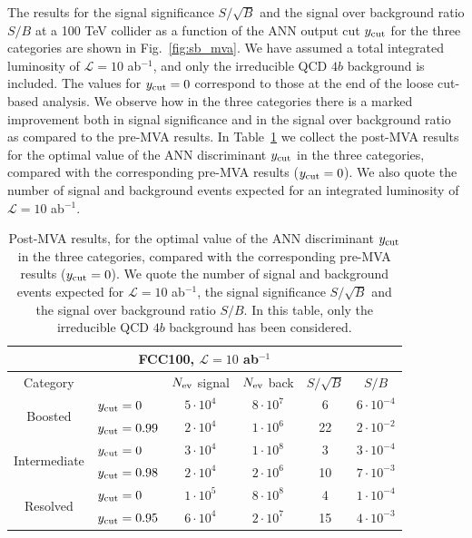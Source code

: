 \documentclass[a4paper,10pt]{article}
\begin{document}
The results for the signal significance $S/\sqrt{B}$ and
the signal over background ratio
$S/B$ at a 100 TeV collider as a function of the ANN output cut $y_{\rm cut}$
for the three categories are shown in 
Fig.~\ref{fig:sb_mva}.
%
We have assumed a total integrated luminosity of $\mathcal{L}=10$ ab$^{-1}$, and only the
irreducible QCD $4b$ background is included.
%
The values 
for $y_{\rm cut}=0$ correspond to those at
the end of the loose cut-based analysis.
%
We observe how in the three
 categories there is a marked  improvement both in signal
 significance and in the signal over
 background ratio as compared to the pre-MVA results.
 In Table~\ref{table:cutflowMVA} we collect
 the post-MVA results for the optimal value of the
    ANN discriminant $y_{\rm cut}$ in the three categories, compared with the
    corresponding
    pre-MVA results ($y_{\rm cut}=0$).
    We also quote the number of signal and
    background events expected for an integrated
    luminosity of $\mathcal{L}=10$ ab$^{-1}$.



\begin{table}[t]
  \centering
  \begin{tabular}{|c|l|c|c|c|c|}
    \hline
    \multicolumn{6}{|c|}{FCC100, $\mathcal{L}=10$ ab$^{-1}$} \\
    \hline
    \hline
    Category  &   &  $N_{\rm ev}$ signal &  $N_{\rm ev}$ back  &  $S/\sqrt{B}$ & $S/B$ \\ 
    \hline
    \hline
    \multirow{2}{*}{Boosted} &  $y_{\rm cut}=0$  &       $5\cdot 10^4$    &   $8\cdot 10^7$        &  6        &    $6\cdot 10^{-4}$         \\
    &  $y_{\rm cut}=0.99$ &   $2\cdot 10^4$    &  $1\cdot 10^6$         &      22    &    $2\cdot 10^{-2}$     \\
    \hline
    \hline
    \multirow{2}{*}{Intermediate} &  $y_{\rm cut}=0$  &   $3\cdot 10^4$     & $1\cdot 10^8$  & 3   &  $3\cdot 10^{-4}$ \\
       &  $y_{\rm cut}=0.98$ &         $2\cdot 10^4$       &  $2\cdot 10^6$   &  10   & $7\cdot 10^{-3}$        \\
    \hline
    \hline
      \multirow{2}{*}{Resolved} &  $y_{\rm cut}=0$  &  $1\cdot 10^5$      & $8\cdot 10^8$  &   4  & $1\cdot 10^{-4}$  \\
    &  $y_{\rm cut}=0.95 $ &    $6\cdot 10^4$    &   $2\cdot 10^7$        &    15      &    $4\cdot 10^{-3}$     \\
    \hline
      \end{tabular}
  \caption{\small Post-MVA results, for the optimal value of the
    ANN discriminant $y_{\rm cut}$ in the three categories, compared with the
    corresponding
    pre-MVA results ($y_{\rm cut}=0$).
    We quote the number of signal and
    background events expected for $\mathcal{L}=10$ ab$^{-1}$,
    the signal significance $S/\sqrt{B}$ and
    the signal over background ratio $S/B$.
    In this table, only the irreducible
    QCD $4b$ background has been considered.
    \label{table:cutflowMVA}
  }
\end{table}
\end{document}
